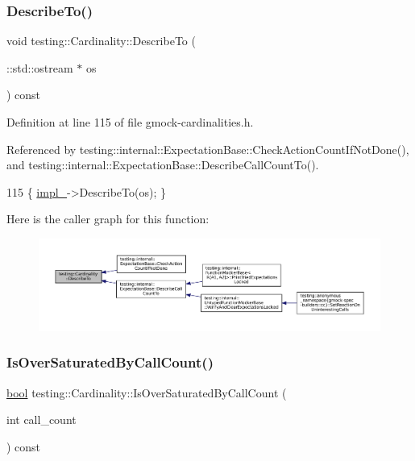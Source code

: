 \subsubsection{\texorpdfstring{Describe\+To()}{DescribeTo()}}
{\footnotesize\ttfamily void testing\+::\+Cardinality\+::\+Describe\+To (\begin{DoxyParamCaption}\item[{\+::std\+::ostream $\ast$}]{os }\end{DoxyParamCaption}) const\hspace{0.3cm}{\ttfamily [inline]}}



Definition at line 115 of file gmock-\/cardinalities.\+h.



Referenced by testing\+::internal\+::\+Expectation\+Base\+::\+Check\+Action\+Count\+If\+Not\+Done(), and testing\+::internal\+::\+Expectation\+Base\+::\+Describe\+Call\+Count\+To().


\begin{DoxyCode}
115 \{ \hyperlink{classtesting_1_1Cardinality_ae8c43c635af16756d535b491ccf19c2f}{impl\_}->DescribeTo(os); \}
\end{DoxyCode}
Here is the caller graph for this function\+:
\nopagebreak
\begin{figure}[H]
\begin{center}
\leavevmode
\includegraphics[width=350pt]{classtesting_1_1Cardinality_a2955f4b65022c422f56e79b767c4fa71_icgraph}
\end{center}
\end{figure}
\mbox{\label{classtesting_1_1Cardinality_a9b6a55179f6dcc8fadec26e6d93f3e88}} 
\subsubsection{\texorpdfstring{Is\+Over\+Saturated\+By\+Call\+Count()}{IsOverSaturatedByCallCount()}}
{\footnotesize\ttfamily \hyperlink{classbool}{bool} testing\+::\+Cardinality\+::\+Is\+Over\+Saturated\+By\+Call\+Count (\begin{DoxyParamCaption}\item[{int}]{call\+\_\+count }\end{DoxyParamCaption}) const\hspace{0.3cm}{\ttfamily [inline]}}




